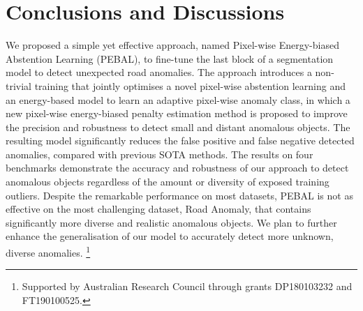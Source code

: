 \documentclass[runningheads]{llncs}
\begin{document}
\begin{table}[!t]
\centering
\caption{The performance comparison of our approach on Fishyscapes benchmark w.r.t different \textbf{amount of OE training samples} (mean results over six random seeds), in terms of AP and FPR95.} 
\label{tab:coco_amount}
\vspace{-10pt}
\end{table}


\vspace{-10pt}
\section{Conclusions and Discussions}
We proposed a simple yet effective approach, named Pixel-wise Energy-biased Abstention Learning (PEBAL), to fine-tune the last block of a segmentation model to detect unexpected road anomalies. 
The approach introduces a non-trivial training that jointly optimises a novel pixel-wise abstention learning and an energy-based model to learn an adaptive pixel-wise anomaly class, in which a new pixel-wise energy-biased penalty estimation method is proposed to improve the precision and robustness to detect small and distant anomalous objects. 
The resulting model significantly reduces the
false positive and false negative detected anomalies, compared with previous SOTA methods. The results on four benchmarks demonstrate the accuracy and robustness of our approach to detect anomalous objects regardless of the amount or diversity of exposed training outliers. Despite the remarkable performance on most datasets, PEBAL is not as effective on the most challenging dataset, Road Anomaly, that contains significantly more diverse and realistic anomalous objects. We plan to further enhance the generalisation of our model to accurately detect more unknown, diverse anomalies. \footnote{Supported by Australian Research Council through grants DP180103232 and FT190100525.}  
\end{document}
